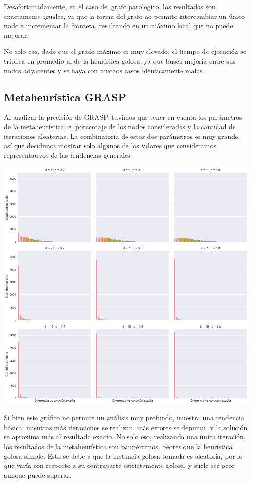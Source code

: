 Desafortunadamente, en el caso del grafo patológico, los resultados son exactamente iguales, ya que la forma del grafo no permite intercambiar un único nodo e incrementar la frontera, resultando en un máximo local que no puede mejorar.

No solo eso, dado que el grado máximo es muy elevado, el tiempo de ejecución se triplica en promedio al de la heurística golosa, ya que busca mejoría entre sus nodos adyacentes y se haya con muchos casos idénticamente malos.

\subsection*{Metaheurística GRASP}

Al analizar la precisión de GRASP, tuvimos que tener en cuenta los parámetros de la metaheurística: el porcentaje de los nodos considerados y la cantidad de iteraciones aleatorias. La combinatoria de estos dos parámetros es muy grande, así que decidimos mostrar solo algunos de los valores que consideramos representativos de las tendencias generales:

\begin{center}
    \includegraphics[scale=0.6]{img/accuracy-grasp-3x3.png}
\end{center}

Si bien este gráfico no permite un análisis muy profundo, muestra una tendencia básica: mientras más iteraciones se realizan, más errores se depuran, y la solución se aproxima más al resultado exacto. No solo eso, realizando una única iteración, los resultados de la metaheurística son paupérrimos, peores que la heurística golosa simple. Esto se debe a que la instancia golosa tomada es aleatoria, por lo que varía con respecto a su contraparte estrictamente golosa, y suele ser peor aunque puede superar.

